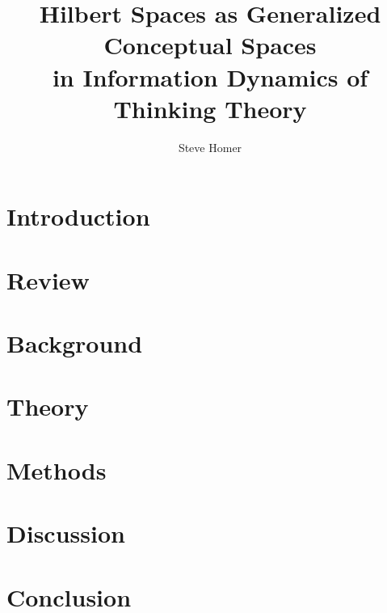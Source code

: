 \documentclass[11pt,oneside,a5paper]{report}
\title{\textbf{Hilbert Spaces as Generalized Conceptual Spaces} \\
in Information Dynamics of Thinking Theory}
\author{Steve Homer}
\date{}
\begin{document}
\maketitle
\tableofcontents

\chapter{Introduction}







\chapter{Review}



\chapter{Background}







\chapter{Theory}






\chapter{Methods}




\chapter{Discussion}


\chapter{Conclusion}







\end{document}
